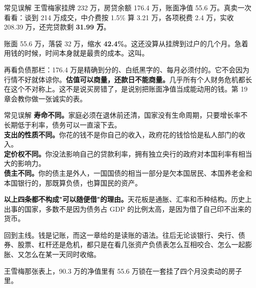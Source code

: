 \begin{mythbox}{常见误解}
王雪梅家挂牌 232 万，房贷余额 176.4 万，账面净值 55.6 万。真卖一次看看：谈到 214 万成交，中介费按 1.5\% 算 3.21 万，各项税费 2.4 万，实收 208.39 万，还完贷款剩 \textbf{31.99 万}。

账面 55.6 万，落袋 32 万，缩水 \textbf{42.4\%}。这还没算从挂牌到过户的几个月。急着用钱的时候，时间本身就是最贵的成本。这叫。

再看负债那栏：176.4 万是精确到分的、白纸黑字的、每月必须付的。它不会因为行情不好就体谅你。\textbf{估值可以商量，还款日不能商量。}几乎所有个人财务危机都长在这个不对称上。这不是说买房错了，是说别把账面净值当成能动用的钱。第 19 章会教你做一张诚实的表。

\end{mythbox}

\begin{mythbox}{常见误解}
\textbf{寿命不同。}家庭必须在退休前还清，国家没有生命周期，只要增长率不长期低于利率，债务可以一直滚下去。\\ \textbf{支出的性质不同。}你花的钱不是你自己的收入，政府花的钱恰恰是私人部门的收入。\\ \textbf{定价权不同。}你没法影响自己的贷款利率，拥有独立央行的政府对本国利率有相当大的影响力。\\ \textbf{债主不同。}你的债主是外人，一国国债的相当一部分是欠本国居民、本国养老金和本国银行的，那既算负债，也算国民的资产。

\textbf{以上四条都不构成"可以随便借"的理由。}天花板是通胀、汇率和币种结构。历史上出事的国家，多数不是因为债务占 GDP 的比例太高，是因为借了自己印不出来的货币。

\end{mythbox}

\bookbreak

回到主线。钱是记账，而这一章给的是读账的语法。往后无论谈银行、央行、债券、股票、杠杆还是危机，都只是在看几张资产负债表怎么互相咬合、怎么一起膨胀、又怎么在某一天同时收缩。

王雪梅那张表上，90.3 万的净值里有 55.6 万锁在一套挂了四个月没卖动的房子里。

